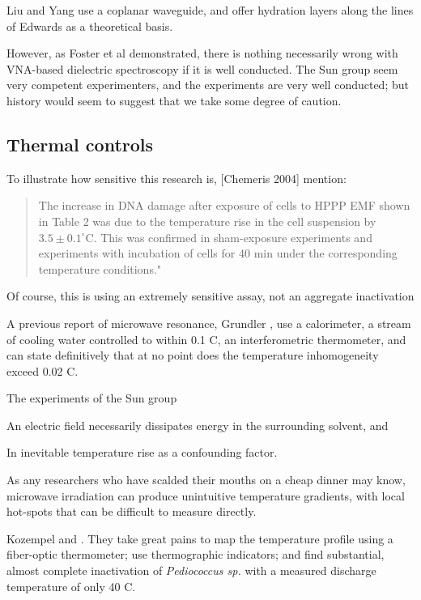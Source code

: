 \documentclass[paper.tex]{subfiles}
\begin{document}
\begin{multicols}{1}
Liu and Yang use a coplanar waveguide, and offer hydration layers along the lines of Edwards as a theoretical basis.




However, as Foster et al demonstrated, there is nothing necessarily wrong with VNA-based dielectric spectroscopy if it is well conducted. The Sun group seem very competent experimenters, and the experiments are very well conducted; but history would seem to suggest that we take some degree of caution.




\subsection{Thermal controls}

To illustrate how sensitive this research is, [Chemeris 2004] mention:

\begin{quote}
	
	The increase in DNA damage after exposure of cells to HPPP EMF shown in Table 2 was due to the temperature rise in the cell suspension by $3.5\pm0.1^{\circ}  $C. This was confirmed in sham-exposure experiments and experiments with incubation of cells for 40 min under the corresponding temperature conditions."
	
\end{quote}

Of course, this is using an extremely sensitive assay, not an aggregate inactivation 

A previous report of microwave resonance, Grundler \cite{Sharp1983}, use a calorimeter, a stream of cooling water controlled to within 0.1 C, an interferometric thermometer, and can state definitively that at no point does the temperature inhomogeneity exceed 0.02 C.

The experiments of the Sun group 

An electric field necessarily dissipates energy in the surrounding solvent, and 

In inevitable temperature rise as a confounding factor. 

As any researchers who have scalded their mouths on a cheap dinner may know, microwave irradiation can produce unintuitive temperature gradients, with local hot-spots that can be difficult to measure directly.

Kozempel \cite{Preliminary1997} and \cite{Inactivationa}. They take great pains to map the temperature profile using a fiber-optic thermometer; use thermographic indicators; and find substantial, almost complete inactivation of {\it Pediococcus sp.} with a measured discharge temperature of only 40 C.


\end{multicols}
\end{document}

